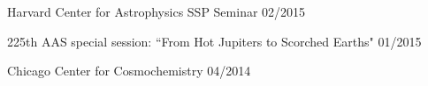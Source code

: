 \documentclass[12pt,letterpaper]{article}
\begin{document}
\begin{compactitem}[]
\item {Harvard Center for Astrophysics SSP Seminar \hfill 02/2015}
\item {225th AAS special session: ``From Hot Jupiters to Scorched Earths" \hfill 01/2015}
\item {Chicago Center for Cosmochemistry \hfill 04/2014}
\end{compactitem}

\vspace{5mm}

\end{document}
